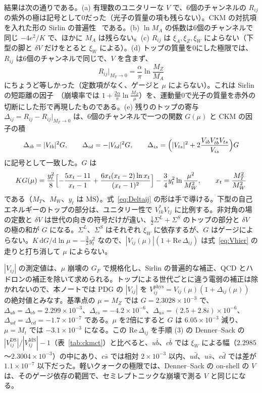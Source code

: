 \documentclass[a4paper,10pt]{ltjsarticle}
\newcommand{\dd}{\mathrm{d}}
\newcommand{\MSbar}{\overline{\mathrm{MS}}}
\newcommand{\re}{\mathrm{Re}\,}
\begin{document}
結果は次の通りである。(a) 有理数のユニタリーな $V$ で、6個のチャンネルの $R_{ij}$ の紫外の極は記号として0だった（光子の質量の項も残らない）。CKM の対抗項を入れた形の Sirlin の普遍性~\cite{sirlin78} である。(b) $\ln M_A$ の係数は6個のチャンネルで同じ $-4e^2/K$ で、ほかに $M_A$ は残らない。(c) $R_{ij}$ は $\xi_A,\xi_Z,\xi_W$ によらない（下型の脚と $\delta V$ だけをとると $\xi_W$ による）。(d) トップの質量を0にした極限では、$R_{ij}$ は6個のチャンネルで同じで、$V$ を含まず、
\begin{equation}
R_{ij}\big|_{M_T\to0}=\frac{\alpha}{\pi}\ln\frac{M_Z}{M_A}
\label{eq:sirlinSD}
\end{equation}
にちょうど等しかった（定数項がなく、ゲージと $\mu$ によらない）。これは Sirlin の短距離の因子~\cite{sirlin82}（崩壊率では $1+\frac{2\alpha}\pi\ln\frac{M_Z}\mu$）を、運動量0で光子の質量を赤外の切断にした形で再現したものである。(e) 残りのトップの寄与 $\Delta_{ij}=R_{ij}-R_{ij}|_{M_T\to0}$ は、6個のチャンネルで一つの関数 $G(\mu)$ と CKM の因子の積
\begin{equation}
\Delta_{ib}=|V_{tb}|^2G,\qquad \Delta_{id}=-|V_{td}|^2G,\qquad \Delta_{is}=\Bigl(|V_{ts}|^2+2\frac{V_{ib}V_{tb}^*V_{ts}}{V_{is}}\Bigr)G
\label{eq:Deltaij}
\end{equation}
に記号として一致した。$G$ は
\begin{equation}
KG(\mu)=\frac{y_t^2}8\Bigl[-\frac{5x_t-11}{x_t-1}+\frac{6x_t(x_t-2)\ln x_t}{(x_t-1)^2}\Bigr]-\frac34y_t^2\ln\frac{\mu^2}{M_W^2},\qquad x_t=\frac{M_T^2}{M_W^2}
\label{eq:Gmu}
\end{equation}
である（$M_T$、$M_W$、$y_t$ は $\MSbar$）。式~\eqref{eq:Deltaij} の形は手で導ける。下型の自己エネルギーのトップの部分は、ユニタリー性で $V^*_{tk}V_{tj}$ に比例する。非対角の場の定数と $\delta V$ は世代の向きの符号だけが違い、$\frac12\Sigma^L+\Sigma^S$ のトップの部分と $\delta V$ の極の和が $G$ になる。$\Sigma^L$、$\Sigma^S$ はそれぞれ $\xi_W$ に依存するが、$G$ はゲージによらない。$K\,\dd G/\dd\ln\mu=-\frac32y_t^2$ なので、$|V_{ij}(\mu)|(1+\re\Delta_{ij})$ は式~\eqref{eq:Vhier} の走りと打ち消して $\mu$ によらない。

$|V_{ij}|$ の測定値は、$\mu$ 崩壊の $G_F$ で規格化し、Sirlin の普遍的な補正、QCD とハドロンの補正を除いて求められる。トップによる世代ごとに違う電弱の補正は除かれないので、本ノートでは PDG の $|V_{ij}|$ を $V^{\mathrm{phys}}_{ij}=V_{ij}(\mu)(1+\Delta_{ij}(\mu))$ の絶対値とみなす。基準点の $\mu=M_Z$ では $G=2.3028\times10^{-3}$ で、$\Delta_{ub}=\Delta_{cb}=2.299\times10^{-3}$、$\Delta_{cs}=-4.2\times10^{-6}$、$\Delta_{us}=(2.5+2.8i)\times10^{-6}$、$\Delta_{ud}=\Delta_{cd}=-1.7\times10^{-7}$ である。$\mu$ を2倍にすると $G$ は $6.05\times10^{-3}$ 減り、$\mu=M_t$ では $-3.1\times10^{-3}$ になる。この $\re\Delta_{ij}$ を手順 (3) の Denner--Sack の $|V^{\mathrm{DS}}_{ij}|/|V^{\MSbar}_{ij}|-1$（表~\ref{tab:ckmct}）と比べると、$u\bar b$、$c\bar b$ では $\xi_W$ による幅（$2.2985$〜$2.3004\times10^{-3}$）の中にあり、$c\bar s$ では相対 $2\times10^{-3}$ 以内、$u\bar d$、$u\bar s$、$c\bar d$ では差が $1.1\times10^{-7}$ 以下だった。軽いクォークの極限では、Denner--Sack の on-shell の $V$ は、そのゲージ依存の範囲で、セミレプトニックな崩壊で測る $V$ と同じになる。
\end{document}
